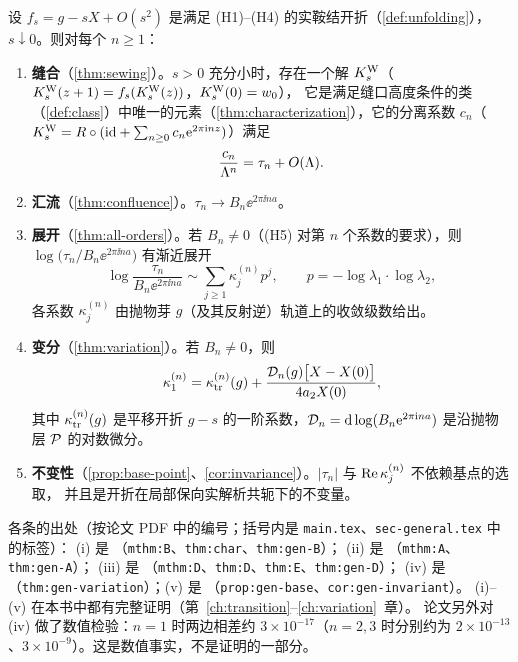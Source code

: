 \begin{theorem}[主定理]\label{thm:main-preview}
设 $f_s=g-sX+O(s^2)$ 是满足 \textup{(H1)--(H4)} 的实鞍结开折（\cref{def:unfolding}），$s\downarrow0$。则对每个 $n\ge1$：
\begin{enumerate}[label=\textup{(\roman*)},leftmargin=2.2em]
\item \textbf{缝合}（\cref{thm:sewing}）。$s>0$ 充分小时，存在一个解 $K^{\mathrm W}_s$（$K^{\mathrm W}_s(z+1)=f_s(K^{\mathrm W}_s(z))$，$K^{\mathrm W}_s(0)=w_0$），
  它是满足缝口高度条件的类（\cref{def:class}）中唯一的元素（\cref{thm:characterization}），它的分离系数 $c_n$（$K^{\mathrm W}_s=R\circ(\mathrm{id}+\sum_{n\ge0}c_n\mathrm{e}^{2\pi\mathrm{i} nz})$）满足
  \[
    \frac{c_n}{\Lambda^n}=\tau_n+O(\Lambda).
  \]
\item \textbf{汇流}（\cref{thm:confluence}）。$\tau_n\to B_n\ee^{2\pi\ii na}$。
\item \textbf{展开}（\cref{thm:all-orders}）。若 $B_n\ne0$（(H5) 对第 $n$ 个系数的要求），则 $\log\bigl(\tau_n/B_n\ee^{2\pi\ii na}\bigr)$ 有渐近展开
  \[
    \log\frac{\tau_n}{B_n\ee^{2\pi\ii na}}\sim\sum_{j\ge1}\kappa^{(n)}_jp^j,\qquad p=-\log\lambda_1\cdot\log\lambda_2,
  \]
  各系数 $\kappa^{(n)}_j$ 由抛物芽 $g$（及其反射逆）轨道上的收敛级数给出。
\item \textbf{变分}（\cref{thm:variation}）。若 $B_n\ne0$，则
  \[
    \kappa^{(n)}_1=\kappa_{\mathrm{tr}}^{(n)}(g)+\frac{\mathcal D_n(g)\bigl[X-X(0)\bigr]}{4a_2X(0)},
  \]
  其中 $\kappa_{\mathrm{tr}}^{(n)}(g)$ 是平移开折 $g-s$ 的一阶系数，$\mathcal D_n=\mathrm{d}\log(B_n\mathrm{e}^{2\pi\mathrm{i} na})$ 是沿抛物层 $\mathcal P$ 的对数微分。
\item \textbf{不变性}（\cref{prop:base-point}、\cref{cor:invariance}）。$|\tau_n|$ 与 $\operatorname{Re}\kappa^{(n)}_j$ 不依赖基点的选取，
  并且是开折在局部保向实解析共轭下的不变量。
\end{enumerate}
\end{theorem}

各条的出处（按论文 PDF 中的编号；括号内是 \texttt{main.tex}、\texttt{sec-general.tex} 中的标签）：
(i) 是 \cite[Thm.~B、Thm.~8.2 及一般形式 Thm.~9.3]{KneserPaper}（\texttt{mthm:B}、\texttt{thm:char}、\texttt{thm:gen-B}）；
(ii) 是 \cite[Thm.~A 及 Thm.~9.2]{KneserPaper}（\texttt{mthm:A}、\texttt{thm:gen-A}）；
(iii) 是 \cite[Thm.~C、Thms.~5.6、5.8 及 Thm.~9.4]{KneserPaper}（\texttt{mthm:D}、\texttt{thm:D}、\texttt{thm:E}、\texttt{thm:gen-D}）；
(iv) 是 \cite[Thm.~9.10]{KneserPaper}（\texttt{thm:gen-variation}）；(v) 是 \cite[Prop.~9.6、Cor.~9.7]{KneserPaper}（\texttt{prop:gen-base}、\texttt{cor:gen-invariant}）。
(i)--(v) 在本书中都有完整证明（第~\ref{ch:transition}--\ref{ch:variation}~章）。
论文另外对 (iv) 做了数值检验：$n=1$ 时两边相差约 $3\times10^{-17}$（$n=2,3$ 时分别约为 $2\times10^{-13}$、$3\times10^{-9}$）。这是数值事实，不是证明的一部分。

